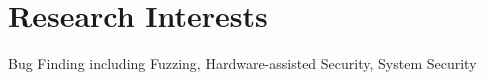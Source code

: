 \section*{Research Interests}
\begin{description}

\item Bug Finding including Fuzzing, Hardware-assisted Security, System Security
\end{description}
